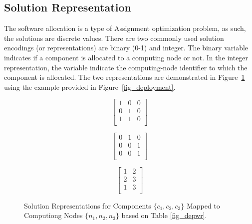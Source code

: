 \subsection{Solution Representation}
The software allocation is a type of Assignment optimization problem, as such, the solutions are discrete values. There are two commonly used solution encodings (or representations) are binary (0-1) and integer. The binary variable indicates if a component is allocated to a computing node or not. In the integer representation, the variable indicate the computing-node identifier to which the component is allocated. The two representations are demonstrated in Figure~\ref{fig_solutionrep} using the example provided in Figure~\ref{fig_deployment}. 
\begin{figure}
	\centering
		\begin{minipage}{.5\textwidth}
		\centering
				\begin{minipage}{.3\textwidth}
				\centering
				\begin{equation*}
				\begin{bmatrix} 
				1 & 0& 0\\
				0 & 1& 0\\
				1 &  1& 0\\
				\end{bmatrix}
				\end{equation*}
			\end{minipage}%
			\begin{minipage}{.3\textwidth}
				\centering
				\begin{equation*}
				\begin{bmatrix} 
				0 & 1& 0\\
				0 & 0& 1\\
				0 &  0& 1\\
				\end{bmatrix}
				\end{equation*}
			\end{minipage}
		\label{fig_binary}
	\end{minipage}
	\begin{minipage}{.4\textwidth}
		\centering
		\begin{equation*}
		\begin{bmatrix} 
		1 & 2\\
		2& 3\\
		1& 3\\
		\end{bmatrix}
		\end{equation*}
		\label{fig_integer}
	\end{minipage}
		\caption{Solution Representations for Components $\{c_1,c_2,c_3\}$ Mapped to Computiong Nodes $\{n_1,n_2,n_3\}$ based on Table \ref{fig_depwr}.}
		\label{fig_solutionrep}
\end{figure}

